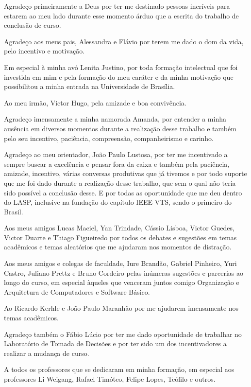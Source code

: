 Agradeço primeiramente a Deus por ter me destinado pessoas incríveis para estarem ao meu lado 
durante esse momento árduo que a escrita do trabalho de conclusão de curso. 

Agradeço aos meus pais, Alessandra e Flávio por terem me dado o dom da vida, pelo incentivo e motivação.

Em especial à minha avó Lenita Justino, por toda formação 
intelectual que foi investida em mim e pela formação do meu caráter e da minha motivação que possibilitou 
a minha entrada na Universidade de Brasília.

Ao meu irmão, Victor Hugo, pela amizade e boa convivência.

Agradeço imensamente a minha namorada Amanda, por entender a minha ausência em diversos momentos durante a realização desse trabalho
e também pelo seu incentivo, paciência, compreensão, companheirismo e carinho.

Agradeço ao meu orientador, João Paulo Lustosa, por ter me incentivado a sempre buscar a excelência e pensar fora da caixa e também
pela paciência, amizade, incentivo, várias conversas produtivas que já tivemos e por todo suporte que me foi dado durante a realização desse 
trabalho, que sem o qual não teria sido possível a conclusão desse. E por todas as oportunidade que me deu dentro do LASP, inclusive na fundação 
do capítulo IEEE VTS, sendo o primeiro do Brasil.

Aos meus amigos Lucas Maciel, Yan Trindade, Cássio Lisboa, Victor Guedes, Victor Duarte e Thiago Figueiredo por todos os debates e sugestões em temas acadêmicos 
e temas aleatórios que me ajudaram nos momentos de distração.

Aos meus amigos e colegas de faculdade, Iure Brandão, Gabriel Pinheiro, Yuri Castro, Juliano Prettz e 
Bruno Cordeiro pelas inúmeras sugestões e parcerias ao longo do curso, em especial àqueles que venceram juntos comigo Organização e Arquitetura
de Computadores e Software Básico.

Ao Ricardo Kerhle e João Paulo Maranhão por me ajudarem imensamente nos temas acadêmicos. 

Agradeço também o Fábio Lúcio por ter me dado oportunidade de trabalhar no Laboratório de Tomada de Decisões e por ter sido um
dos incentivadores a realizar a mudança de curso.

A todos os professores que se dedicaram em minha formação, em especial aos professores Li Weigang, Rafael Timóteo, Felipe Lopes, Teófilo e outros.


